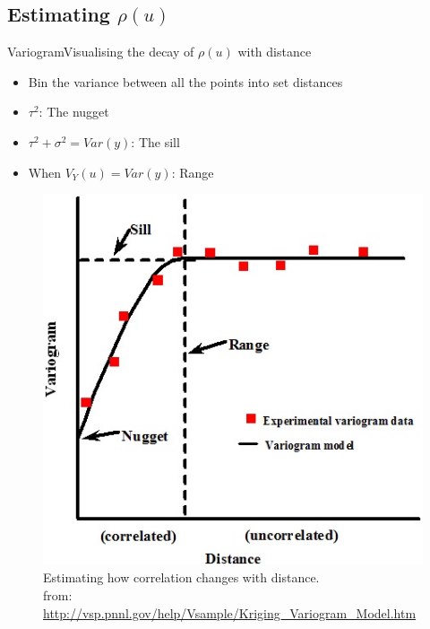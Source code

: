 \documentclass{beamer}
\begin{document}
\subsection{Estimating $\rho(u)$}


\begin{frame}{Variogram}{Visualising the decay of $\rho(u)$ with distance}
  \begin{itemize}
  \item Bin the variance between all the points into set distances
  \item $\tau^2$: The nugget  
  \item $\tau^2 + \sigma^2 = Var(y)$: The sill
  \item When $V_Y(u) = Var(y)$: Range
  \end{itemize}
  	\begin{figure}
	\centering
		\includegraphics[scale = 0.45]{Images/VariogramSummary.jpg}
		\caption{ { \scriptsize Estimating how correlation changes with distance. \\from: \url{http://vsp.pnnl.gov/help/Vsample/Kriging_Variogram_Model.htm}
}}
	\end{figure} 
\end{frame}
\end{document}
